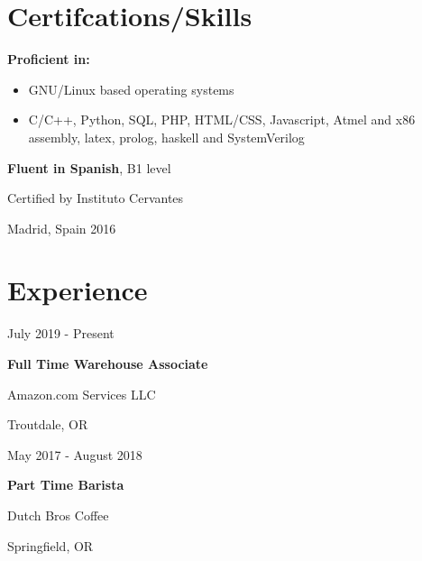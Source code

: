 \documentclass[12pt,letterpaper]{article}
\begin{document}
	\begin{minipage}[t]{0.4\linewidth}


	\section*{Certifcations/Skills}

	\textbf{Proficient in:} 
	\begin{itemize}
		\item GNU/Linux based operating systems
		\item C/C++, Python, SQL, PHP, HTML/CSS, Javascript, Atmel and x86 assembly, 
			latex, prolog, haskell and SystemVerilog
	\end{itemize}
	\hspace{1cm}

	\textbf{Fluent in Spanish}, B1 level

	Certified by Instituto Cervantes

	Madrid, Spain 2016

	\hspace{1cm}


	\section*{Experience}
	July 2019 - Present
	
	\textbf{Full Time Warehouse Associate}
	
	Amazon.com Services LLC

	Troutdale, OR

	\hspace{1cm}
	
	May 2017 - August 2018 
	
	\textbf{Part Time Barista}

	Dutch Bros Coffee 

	Springfield, OR 
	
	\end{minipage}
\end{document}
